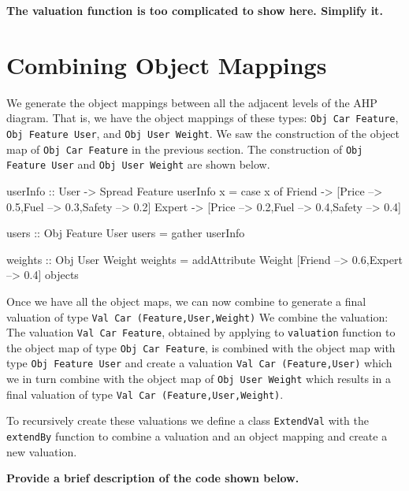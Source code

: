 \documentclass{jfp}
\newcommand{\NOTE}[2][gray]{\smallskip\noindent
  \colorbox{#1!30}{\parbox{.98\linewidth}{{\small\textbf{#2}}}}
}
\newcommand{\prog}[1]{\texttt{#1}}
\begin{document}
\NOTE{The valuation function is too complicated to show here. Simplify it. }

\section{Combining Object Mappings}
We generate the object mappings between all the adjacent levels of the AHP diagram. That is, we have the object mappings of these types: \prog{Obj Car Feature}, \prog{Obj Feature User}, and \prog{Obj User Weight}. We saw the construction of the object map of \prog{Obj Car Feature} in the previous section. The construction of \prog{Obj Feature User} and \prog{Obj User Weight} are shown below.
\begin{haskellcode}
userInfo :: User -> Spread Feature
userInfo x 
    = case x of 
        Friend -> [Price --> 0.5,Fuel --> 0.3,Safety --> 0.2]
        Expert -> [Price --> 0.2,Fuel --> 0.4,Safety --> 0.4]

users :: Obj Feature User
users = gather userInfo

weights :: Obj User Weight
weights = addAttribute Weight [Friend --> 0.6,Expert --> 0.4] objects
\end{haskellcode}
Once we have all the object maps, we can now combine to generate a final valuation of type \prog{Val Car (Feature,User,Weight)} We combine the valuation: The valuation \prog{Val Car Feature}, obtained by applying to \prog{valuation} function to the object map of type \prog{Obj Car Feature}, is combined with the object map with type \prog{Obj Feature User} and create a valuation \prog{Val Car (Feature,User)} which we in turn combine with the object map of \prog{Obj User Weight} which results in a final valuation of type \prog{Val Car (Feature,User,Weight)}. 

To recursively create these valuations we define a class \prog{ExtendVal} with the \prog{extendBy} function to combine a valuation and an object mapping and create a new valuation. 

\NOTE{Provide a brief description of the code shown below.}


\end{document}
